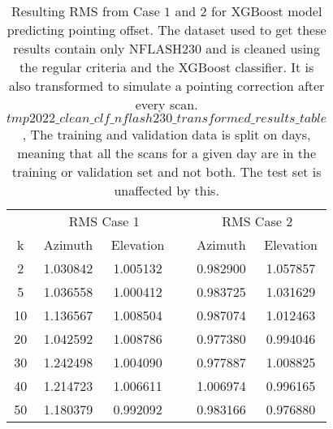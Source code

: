 \begin{table}[h]
    \centering
    \caption{Resulting RMS from Case $1$ and $2$ for XGBoost model predicting pointing offset.
    The dataset used to get these results contain only NFLASH230 and is cleaned using the regular criteria and the XGBoost classifier.
    It is also transformed to simulate a pointing correction after every scan.
    $tmp2022\_clean\_clf\_nflash230\_transformed\_results\_table$,
    The training and validation data is split on days, meaning that all the scans for a given day
    are in the training or validation set and not both. The test set is unaffected by this.}
    \begin{tabular}{ccc c cc}
        \toprule
        \multicolumn{1}{c}{} & \multicolumn{2}{c}{RMS Case 1} & & \multicolumn{2}{c}{RMS Case 2} \\
        \cmidrule(lr){2-3} \cmidrule(lr){5-6}
         k & Azimuth & Elevation & & Azimuth & Elevation \\
        \midrule
        2 &  1.030842 &  1.005132 & &  0.982900 &  1.057857 \\
        5 &  1.036558 &  1.000412 & &  0.983725 &  1.031629 \\
       10 &  1.136567 &  1.008504 & &  0.987074 &  1.012463 \\
       20 &  1.042592 &  1.008786 & &  0.977380 &  0.994046 \\
       30 &  1.242498 &  1.004090 & &  0.977887 &  1.008825 \\
       40 &  1.214723 &  1.006611 & &  1.006974 &  0.996165 \\
       50 &  1.180379 &  0.992092 & &  0.983166 &  0.976880 \\
        \bottomrule
    \end{tabular}
\end{table}

